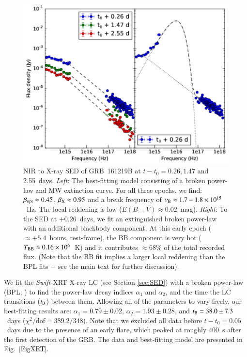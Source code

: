 \documentclass[traditabstract,longauth]{aa}
\begin{document}
\begin{figure}
   \centering %
   \includegraphics[width=\columnwidth]{Fig4_SED_plot-eps-converted-to.pdf}
      \caption{NIR to X-ray SED of GRB~161219B at $t-t_0 = 0.26, 1.47$ and 2.55~days.  \textit{Left}: The best-fitting model consisting of a broken power-law and MW extinction curve.  For all three epochs, we find: $\beta_{\rm opt} \approx 0.45$, $\beta_{\rm X} \approx 0.95$ and a break frequency of $\nu_{\rm B} \approx 1.7-1.8\times10^{15}$~Hz.  The local reddening is low ($E(B-V) \approx 0.02$~mag). \textit{Right}: To the SED at $+0.26$~days, we fit an extinguished broken power-law with an additional blackbody component.  At this early epoch ($\approx+5.4$~hours, rest-frame), the BB component is very hot ($T_{\rm BB} \approx 0.16\times10^{6}$~K) and it contributes $\approx 68$\% of the total recorded flux. (Note that the BB fit implies a larger local reddening than the BPL fits $-$ see the main text for further discussion).}
         \label{FigSED}
\end{figure}



We fit the \emph{Swift}-XRT X-ray LC (see Section \ref{sec:SED}) with a broken power-law (BPL; \citealt{Beuermann99}) to find the power-law decay indices $\alpha_{1}$ and $\alpha_{2}$, and the time the LC transitions ($t_{\rm B}$) between them.  Allowing all of the parameters to vary freely, our best-fitting results are: $\alpha_{1} = 0.79\pm0.02$, $\alpha_{2} = 1.93\pm0.28$, and $t_{\rm B} = 38.0\pm7.3$~days ($\chi^2/$dof$ = 389.2/348$).  Note that we excluded all data before $t-t_{0} = 0.05$~days due to the presence of an early flare, which peaked at roughly 400~s after the first detection of the GRB.  The data and best-fitting model are presented in Fig.~\ref{FigXRT}.
\end{document}
